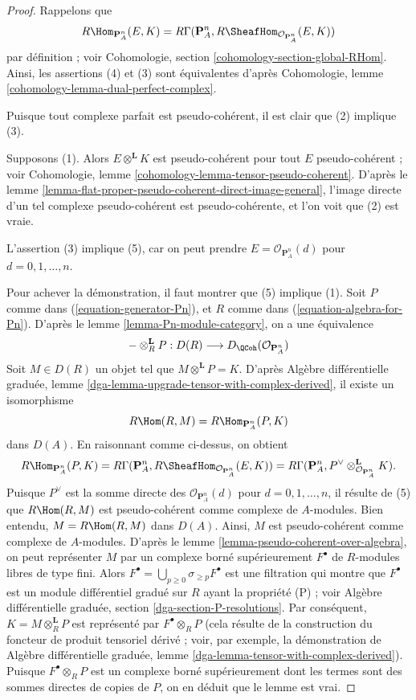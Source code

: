 \begin{proof}
Rappelons que
$$
R\Hom_{\mathbf{P}^n_A}(E, K) =
R\Gamma(\mathbf{P}^n_A, R\SheafHom_{\mathcal{O}_{\mathbf{P}^n_A}}(E, K))
$$
par définition ; voir Cohomologie, section \ref{cohomology-section-global-RHom}.
Ainsi, les assertions (4) et (3) sont équivalentes d'après
Cohomologie, lemme \ref{cohomology-lemma-dual-perfect-complex}.

\medskip\noindent
Puisque tout complexe parfait est pseudo-cohérent, il est clair que
(2) implique (3).

\medskip\noindent
Supposons (1). Alors $E \otimes^\mathbf{L} K$ est pseudo-cohérent
pour tout $E$ pseudo-cohérent ; voir
Cohomologie, lemme \ref{cohomology-lemma-tensor-pseudo-coherent}.
D'après le lemme \ref{lemma-flat-proper-pseudo-coherent-direct-image-general},
l'image directe d'un tel complexe pseudo-cohérent est pseudo-cohérente,
et l'on voit que (2) est vraie.

\medskip\noindent
L'assertion (3) implique (5), car on peut prendre $E = \mathcal{O}_{\mathbf{P}^n_A}(d)$
pour $d = 0, 1, \ldots, n$.

\medskip\noindent
Pour achever la démonstration, il faut montrer que (5) implique (1).
Soit $P$ comme dans (\ref{equation-generator-Pn}), et
$R$ comme dans (\ref{equation-algebra-for-Pn}).
D'après le lemme \ref{lemma-Pn-module-category}, on a une équivalence
$$
- \otimes^\mathbf{L}_R P :
D(R) \longrightarrow D_\QCoh(\mathcal{O}_{\mathbf{P}^n_A})
$$
Soit $M \in D(R)$ un objet tel que $M \otimes^\mathbf{L} P = K$.
D'après Algèbre différentielle graduée, lemme
\ref{dga-lemma-upgrade-tensor-with-complex-derived},
il existe un isomorphisme
$$
R\Hom(R, M) = R\Hom_{\mathbf{P}^n_A}(P, K)
$$
dans $D(A)$. En raisonnant comme ci-dessus, on obtient
$$
R\Hom_{\mathbf{P}^n_A}(P, K) = R\Gamma(\mathbf{P}^n_A,
R\SheafHom_{\mathcal{O}_{\mathbf{P}^n_A}}(E, K)) =
R\Gamma(\mathbf{P}^n_A,
P^\vee \otimes^\mathbf{L}_{\mathcal{O}_{\mathbf{P}^n_A}} K).
$$
Puisque $P^\vee$ est la somme directe des
$\mathcal{O}_{\mathbf{P}^n_A}(d)$ pour $d = 0, 1, \ldots, n$,
il résulte de (5) que $R\Hom(R, M)$ est pseudo-cohérent comme complexe
de $A$-modules. Bien entendu, $M = R\Hom(R, M)$ dans $D(A)$.
Ainsi, $M$ est pseudo-cohérent comme complexe de $A$-modules.
D'après le lemme \ref{lemma-pseudo-coherent-over-algebra},
on peut représenter $M$ par un complexe borné supérieurement $F^\bullet$
de $R$-modules libres de type fini. Alors
$F^\bullet = \bigcup_{p \geq 0} \sigma_{\geq p}F^\bullet$
est une filtration qui montre que $F^\bullet$ est un module différentiel
gradué sur $R$ ayant la propriété (P) ; voir
Algèbre différentielle graduée, section \ref{dga-section-P-resolutions}.
Par conséquent, $K = M \otimes^\mathbf{L}_R P$ est représenté
par $F^\bullet \otimes_R P$ (cela résulte de la construction du
foncteur de produit tensoriel dérivé ; voir, par exemple, la démonstration de
Algèbre différentielle graduée, lemme \ref{dga-lemma-tensor-with-complex-derived}).
Puisque $F^\bullet \otimes_R P$
est un complexe borné supérieurement dont les termes sont des sommes directes de
copies de $P$, on en déduit que le lemme est vrai.
\end{proof}

